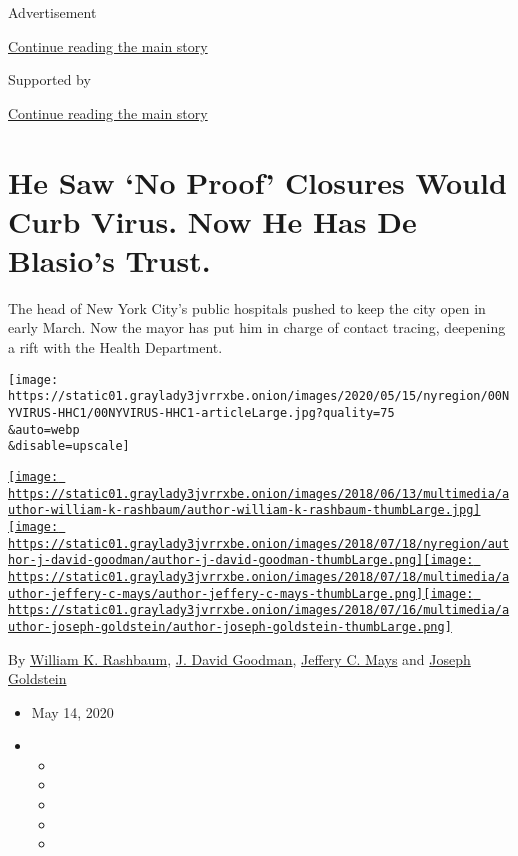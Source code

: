 Advertisement

\protect\hyperlink{after-top}{Continue reading the main story}

Supported by

\protect\hyperlink{after-sponsor}{Continue reading the main story}

\hypertarget{he-saw-no-proof-closures-would-curb-virus-now-he-has-de-blasios-trust}{%
\section{He Saw `No Proof' Closures Would Curb Virus. Now He Has De
Blasio's
Trust.}\label{he-saw-no-proof-closures-would-curb-virus-now-he-has-de-blasios-trust}}

The head of New York City's public hospitals pushed to keep the city
open in early March. Now the mayor has put him in charge of contact
tracing, deepening a rift with the Health Department.

\texttt{[image: https://static01.graylady3jvrrxbe.onion/images/2020/05/15/nyregion/00NYVIRUS-HHC1/00NYVIRUS-HHC1-articleLarge.jpg?quality=75\\\&auto=webp\\\&disable=upscale]}

\href{https://www.nytimes3xbfgragh.onion/by/william-k-rashbaum}{\texttt{[image: https://static01.graylady3jvrrxbe.onion/images/2018/06/13/multimedia/author-william-k-rashbaum/author-william-k-rashbaum-thumbLarge.jpg]}}\href{https://www.nytimes3xbfgragh.onion/by/j-david-goodman}{\texttt{[image: https://static01.graylady3jvrrxbe.onion/images/2018/07/18/nyregion/author-j-david-goodman/author-j-david-goodman-thumbLarge.png]}}\href{https://www.nytimes3xbfgragh.onion/by/jeffery-c-mays}{\texttt{[image: https://static01.graylady3jvrrxbe.onion/images/2018/07/18/multimedia/author-jeffery-c-mays/author-jeffery-c-mays-thumbLarge.png]}}\href{https://www.nytimes3xbfgragh.onion/by/joseph-goldstein}{\texttt{[image: https://static01.graylady3jvrrxbe.onion/images/2018/07/16/multimedia/author-joseph-goldstein/author-joseph-goldstein-thumbLarge.png]}}

By
\href{https://www.nytimes3xbfgragh.onion/by/william-k-rashbaum}{William
K. Rashbaum},
\href{https://www.nytimes3xbfgragh.onion/by/j-david-goodman}{J. David
Goodman},
\href{https://www.nytimes3xbfgragh.onion/by/jeffery-c-mays}{Jeffery C.
Mays} and
\href{https://www.nytimes3xbfgragh.onion/by/joseph-goldstein}{Joseph
Goldstein}

\begin{itemize}
\item
  May 14, 2020
\item
  \begin{itemize}
  \item
  \item
  \item
  \item
  \item
  \end{itemize}
\end{itemize}

